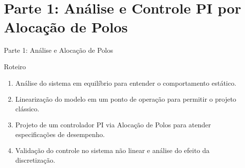 \documentclass{beamer}
\begin{document}
\section{Parte 1: Análise e Controle PI por Alocação de Polos}

\begin{frame}{Parte 1: Análise e Alocação de Polos}
    \begin{block}{Roteiro}
        \begin{enumerate}
            \item Análise do sistema em equilíbrio para entender o comportamento estático.
            \item Linearização do modelo em um ponto de operação para permitir o projeto clássico.
            \item Projeto de um controlador PI via Alocação de Polos para atender especificações de desempenho.
            \item Validação do controle no sistema não linear e análise do efeito da discretização.
        \end{enumerate}
    \end{block}
\end{frame}
\end{document}
